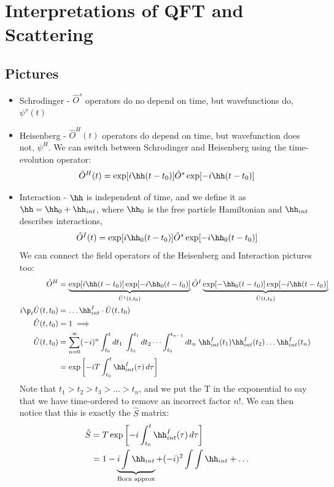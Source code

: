 \documentclass[a4paper, 11pt, normalem]{report}
\begin{document}
\chapter{Interpretations of QFT and Scattering}
\section{Pictures}
\begin{itemize}
    \item Schrodinger - $\hat{O}^{s}$ operators do no depend on time, but wavefunctions do, $\psi^s(t)$
    \item Heisenberg - $\hat{O}^H(t)$ operators do depend on time, but wavefunction does not, $\psi^H$.
        We can switch between Schrodinger and Heisenberg using the time-evolution operator:
        \begin{align}
            \hat{O}^H(t) &= \exp[i\hh(t-t_0)]\hat{O}^s\exp[-i\hh(t-t_0)] \\
        \end{align}
    \item Interaction - $\hh$ is independent of time, and we define it as $\hh = \hh_0 + \hh_{int}$, where $\hh_0$ is the free particle Hamiltonian and $\hh_{int}$ describes interactions,
        \begin{equation}
            \hat{O}^I(t) = \exp[i\hh_0(t-t_0)]\hat{O}^s\exp[-i\hh_0(t-t_0)]
        \end{equation}
        We can connect the field operators of the Heisenberg and Interaction pictures too:
        \begin{align}
            \hat{O}^H &= \underbrace{\exp[i\hh(t-t_0)]\exp[-i\hh_0(t-t_0)]}_{\hat{U}^\dagger(t,t_0)}\hat{O}^I\underbrace{\exp[-\hh_0(t-t_0)]\exp[-i\hh(t-t_0)]}_{\hat{U}(t,t_0)} \\
            i\p_t\hat{U}(t,t_0) &= \dots \hh_{int}^I\cdot\hat{U}(t,t_0) \\
            \hat{U}(t,t_0) &= 1 \implies \\
            \hat{U}(t,t_0) &= \sum_{n=0}^\infty (-i)^n \int_{t_0}^t dt_1\; \int_{t_0}^{t_1} dt_2\, \dots \int_{t_0}^{t_{n-1}}dt_n \; \hh_{int}^I(t_1)\hh_{int}^I(t_2)\dots\hh_{int}^I(t_n) \\
                           &= \exp\left[-iT \int_{t_0}^t \hh_{int}^I(\tau)\,d\tau\right]
        \end{align}
        Note that $t_1>t_2>t_3>\dots>t_n$, and we put the T in the exponential to say that we have time-ordered to remove an incorrect factor $n!$.
        We can then notice that this is exactly the $\hat{S}$ matrix:
        \begin{align}
            \hat{S} &= T\exp\left[-i\int_{t_0}^t \hh_{int}^I(\tau)\,d\tau\right] \\
                    &= 1 - \underbrace{i\int \hh_{int}}_{\text{Born approx}} + (-i)^2 \int \int \hh_{int} + \dots
        \end{align}
\end{itemize}
\end{document}
